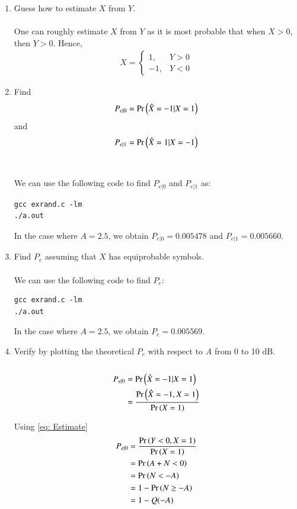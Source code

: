 \documentclass[journal,12pt,twocolumn]{IEEEtran}
\renewcommand\thesection{\arabic{section}}
\begin{document}
\begin{enumerate}[label=\thesection.\arabic*
,ref=\thesection.\theenumi]
\item Guess how to estimate $X$ from $Y$.
	\\
	\solution
	\\
	One can roughly estimate $X$ from $Y$ as it is most probable that when $X > 0$, then $Y > 0$. Hence,
	\begin{align}
		X =
		\begin{cases}
			1, & Y > 0 \\
			-1, & Y < 0
		\end{cases}
		\label{eq: Estimate}
	\end{align}

\item
	\label{ml-ch4_sim}
	Find 
	\begin{equation}
		P_{e|0} = \Pr\left(\hat{X} = -1|X=1\right)
	\end{equation}
	and 
	\begin{equation}
		P_{e|1} = \Pr\left(\hat{X} = 1|X=-1\right)
	\end{equation}
	\\
	\solution
	\\
	We can use the following code to find $P_{e|0}$ and $P_{e|1}$ as:
	\begin{lstlisting}
gcc exrand.c -lm
./a.out
	\end{lstlisting}

	In the case where $A = 2.5$, we obtain $P_{e|0} = 0.005478$ and $P_{e|1} = 0.005660$.
	
\item Find $P_e$ assuming that $X$ has equiprobable symbols.
	\\
	\solution
	\\
	We can use the following code to find $P_{e}$:
	\begin{lstlisting}
gcc exrand.c -lm
./a.out
	\end{lstlisting}

	In the case where $A = 2.5$, we obtain $P_{e} = 0.005569$.

\item Verify by plotting the theoretical $P_e$ with respect to $A$ from 0 to 10 dB.  
	\\
	\solution
	\\
	\begin{align}
		P_{e|0} &= \Pr\left(\hat{X} = -1|X = 1\right) \\
		&= \frac{\Pr\left(\hat{X} = -1, X = 1\right)}{\Pr\left(X = 1\right)}
	\end{align}

	Using \eqref{eq: Estimate}
	\begin{align}
		P_{e|0} &= \frac{\Pr\left(Y < 0, X = 1\right)}{\Pr\left(X = 1\right)} \\
		&= \Pr\left(A + N < 0\right) \\
		&= \Pr\left(N < -A\right) \\
		&= 1 - \Pr\left(N \geq -A\right)\\
		&= 1 - Q(-A)
		\label{eq:PE0}
	\end{align}


\end{enumerate}
\end{document}
